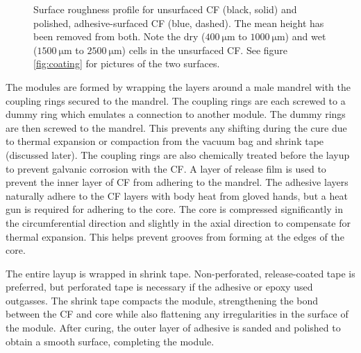 \documentclass{aiaa-tc}%
\begin{document}
\begin{figure}
\centering

	\caption{Surface roughness profile for unsurfaced CF (black, solid) and polished, adhesive-surfaced CF (blue, dashed). The mean height has been removed from both. Note the dry ($\SI{400}{\micro\meter}$ to $\SI{1000}{\micro\meter}$) and wet ($\SI{1500}{\micro\meter}$ to $\SI{2500}{\micro\meter}$) cells in the unsurfaced CF. See figure \ref{fig:coating} for pictures of the two surfaces.}
\label{fig:roughness}
\end{figure}

The modules are formed by wrapping the layers around a male mandrel with the coupling rings secured to the mandrel.
The coupling rings are each screwed to a dummy ring which emulates a connection to another module. The dummy rings are then screwed to the mandrel.
This prevents any shifting during the cure due to thermal expansion or compaction from the vacuum bag and shrink tape (discussed later).
The coupling rings are also chemically treated before the layup to prevent galvanic corrosion with the CF.
A layer of release film is used to prevent the inner layer of CF from adhering to the mandrel. 
The adhesive layers naturally adhere to the CF layers with body heat from gloved hands, but a heat gun is required for adhering to the core. 
The core is compressed significantly in the circumferential direction and slightly in the axial direction to compensate for thermal expansion. This helps prevent grooves from forming at the edges of the core.

The entire layup is wrapped in shrink tape. Non-perforated, release-coated tape is preferred, but perforated tape is necessary if the adhesive or epoxy used outgasses.
The shrink tape compacts the module, strengthening the bond between the CF and core while also flattening any irregularities in the surface of the module. 
After curing, the outer layer of adhesive is sanded and polished to obtain a smooth surface, completing the module. 
\end{document}
